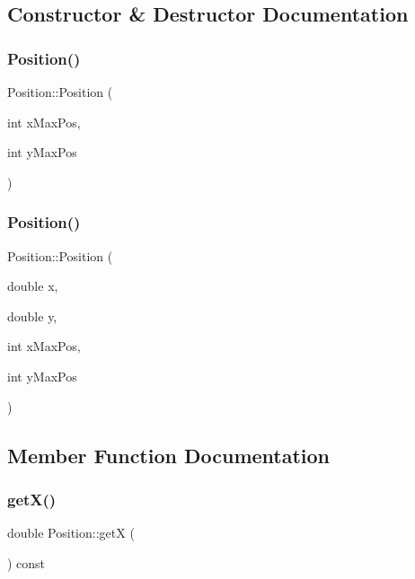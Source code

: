 \subsection{Constructor \& Destructor Documentation}
\mbox{\label{class_position_a64f68cd96fa0eedccbb760143b82442a}} 
\subsubsection{\texorpdfstring{Position()}{Position()}\hspace{0.1cm}{\footnotesize\ttfamily [1/2]}}
{\footnotesize\ttfamily Position\+::\+Position (\begin{DoxyParamCaption}\item[{int}]{x\+Max\+Pos,  }\item[{int}]{y\+Max\+Pos }\end{DoxyParamCaption})}

\mbox{\label{class_position_ace954f29b47b5324517ea8ed2487c949}} 
\subsubsection{\texorpdfstring{Position()}{Position()}\hspace{0.1cm}{\footnotesize\ttfamily [2/2]}}
{\footnotesize\ttfamily Position\+::\+Position (\begin{DoxyParamCaption}\item[{double}]{x,  }\item[{double}]{y,  }\item[{int}]{x\+Max\+Pos,  }\item[{int}]{y\+Max\+Pos }\end{DoxyParamCaption})}



\subsection{Member Function Documentation}
\mbox{\label{class_position_a10a2a09ec64310f42138f98238ec5fbd}} 
\subsubsection{\texorpdfstring{get\+X()}{getX()}}
{\footnotesize\ttfamily double Position\+::getX (\begin{DoxyParamCaption}{ }\end{DoxyParamCaption}) const}

